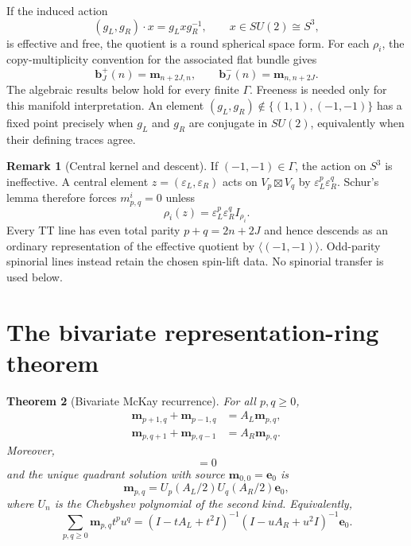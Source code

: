 \documentclass[11pt]{article}
\newtheorem{theorem}{Theorem}[section]
\theoremstyle{definition}
\newtheorem{remark}[theorem]{Remark}
\begin{document}
If the induced action
\[
 (g_L,g_R)\cdot x=g_Lxg_R^{-1},\qquad x\in SU(2)\cong S^3,
\]
is effective and free, the quotient is a round spherical space form.
For each $\rho_i$, the copy-multiplicity convention for the associated
flat bundle gives
\begin{equation}
 \boldsymbol b_J^+(n)=\boldsymbol m_{n+2J,n},
 \qquad
 \boldsymbol b_J^-(n)=\boldsymbol m_{n,n+2J}.
 \label{eq:branch-multiplicities}
\end{equation}
The algebraic results below hold for every finite $\Gamma$.  Freeness is
needed only for this manifold interpretation.  An element
$(g_L,g_R)\notin\{(1,1),(-1,-1)\}$ has a fixed point precisely when
$g_L$ and $g_R$ are conjugate in $SU(2)$, equivalently when their
defining traces agree.

\begin{remark}[Central kernel and descent]
\label{rem:central-descent}
If $(-1,-1)\in\Gamma$, the action on $S^3$ is ineffective.  A central
element $z=(\varepsilon_L,\varepsilon_R)$ acts on
$V_p\boxtimes V_q$ by
$\varepsilon_L^p\varepsilon_R^q$.  Schur's lemma therefore forces
$m_{p,q}^i=0$ unless
\[
 \rho_i(z)=\varepsilon_L^p\varepsilon_R^q I_{\rho_i}.
\]
Every TT line has even total parity $p+q=2n+2J$ and hence descends as
an ordinary representation of the effective quotient by
$\langle(-1,-1)\rangle$.  Odd-parity spinorial lines instead retain
the chosen spin-lift data.  No spinorial transfer is used below.
\end{remark}

\section{The bivariate representation-ring theorem}

\begin{theorem}[Bivariate McKay recurrence]
\label{thm:bivariate}
For all $p,q\geq0$,
\begin{align}
 \boldsymbol m_{p+1,q}+\boldsymbol m_{p-1,q}
 &=A_L\boldsymbol m_{p,q},
 \label{eq:left-rec}\\
 \boldsymbol m_{p,q+1}+\boldsymbol m_{p,q-1}
 &=A_R\boldsymbol m_{p,q}.
 \label{eq:right-rec}
\end{align}
Moreover,
\begin{equation}
 [A_L,A_R]=0
 \label{eq:commuting}
\end{equation}
and the unique quadrant solution with source
$\boldsymbol m_{0,0}=\boldsymbol e_0$ is
\begin{equation}
 \boxed{\;
 \boldsymbol m_{p,q}
 =U_p(A_L/2)U_q(A_R/2)\boldsymbol e_0 ,
 \;}
 \label{eq:Chebyshev-solution}
\end{equation}
where $U_n$ is the Chebyshev polynomial of the second kind.  Equivalently,
\begin{equation}
 \sum_{p,q\geq0}\boldsymbol m_{p,q}t^pu^q
 =
 (I-tA_L+t^2I)^{-1}
 (I-uA_R+u^2I)^{-1}\boldsymbol e_0 .
 \label{eq:bivariate-GF}
\end{equation}
\end{theorem}
\end{document}
